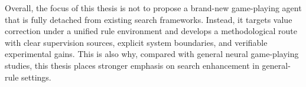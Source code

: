 Overall, the focus of this thesis is not to propose a brand-new game-playing agent that is fully detached from existing search frameworks. Instead, it targets value correction under a unified rule environment and develops a methodological route with clear supervision sources, explicit system boundaries, and verifiable experimental gains. This is also why, compared with general neural game-playing studies, this thesis places stronger emphasis on search enhancement in general-rule settings.
